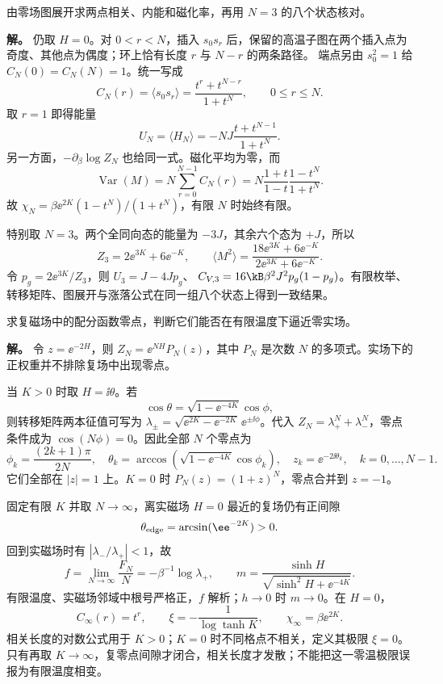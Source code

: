 \begin{exbox}[第四步：相关函数、能量与一个可逐态枚举的 $N=3$ 实例]
由零场图展开求两点相关、内能和磁化率，再用 $N=3$ 的八个状态核对。

\textbf{解。} 仍取 $H=0$。对 $0<r<N$，插入 $s_0s_r$ 后，保留的高温子图在两个插入点为奇度、其他点为偶度；环上恰有长度 $r$ 与 $N-r$ 的两条路径。
端点另由 $s_0^2=1$ 给 $C_N(0)=C_N(N)=1$。统一写成
\[
C_N(r)=\langle s_0s_r\rangle
=\frac{t^r+t^{N-r}}{1+t^N},\qquad 0\le r\le N.
\]
取 $r=1$ 即得能量
\[
U_N=\langle H_N\rangle=-NJ\frac{t+t^{N-1}}{1+t^N}.
\]
另一方面，$-\partial_\beta\log Z_N$ 也给同一式。磁化平均为零，而
\[
\operatorname{Var}(M)
=N\sum_{r=0}^{N-1}C_N(r)
=N\frac{1+t}{1-t}\frac{1-t^N}{1+t^N}.
\]
故 $\chi_N=\beta\ee^{2K}(1-t^N)/(1+t^N)$，有限 $N$ 时始终有限。

特别取 $N=3$。两个全同向态的能量为 $-3J$，其余六个态为 $+J$，所以
\[
Z_3=2\ee^{3K}+6\ee^{-K},\qquad
\langle M^2\rangle
=\frac{18\ee^{3K}+6\ee^{-K}}{2\ee^{3K}+6\ee^{-K}}.
\]
令 $p_g=2\ee^{3K}/Z_3$，则 $U_3=J-4Jp_g$、
$C_{V,3}=16\kB\beta^2J^2p_g(1-p_g)$。有限枚举、转移矩阵、图展开与涨落公式在同一组八个状态上得到一致结果。
\end{exbox}

\begin{exbox}
求复磁场中的配分函数零点，判断它们能否在有限温度下逼近零实场。

\textbf{解。} 令 $z=\ee^{-2H}$，则 $Z_N=\ee^{NH}P_N(z)$，其中 $P_N$ 是次数 $N$ 的多项式。实场下的正权重并不排除复场中出现零点。

当 $K>0$ 时取 $H=\ii\theta$。若
\[
\cos\theta=\sqrt{1-\ee^{-4K}}\cos\phi,
\]
则转移矩阵两本征值可写为
$\lambda_\pm=\sqrt{\ee^{2K}-\ee^{-2K}}\,\ee^{\pm\ii\phi}$。代入 $Z_N=\lambda_+^N+\lambda_-^N$，零点条件成为 $\cos(N\phi)=0$。因此全部 $N$ 个零点为
\[
\phi_k=\frac{(2k+1)\pi}{2N},\quad
\theta_k=\arccos\!\left(\sqrt{1-\ee^{-4K}}\cos\phi_k\right),\quad
z_k=\ee^{-2\ii\theta_k},\quad k=0,\ldots,N-1.
\]
它们全部在 $|z|=1$ 上。$K=0$ 时 $P_N(z)=(1+z)^N$，零点合并到 $z=-1$。

固定有限 $K$ 并取 $N\to\infty$，离实磁场 $H=0$ 最近的复场仍有正间隙
\[
\theta_{\rm edge}=\arcsin(\ee^{-2K})>0.
\]
回到实磁场时有 $|\lambda_-/\lambda_+|<1$，故
\[
f=\lim_{N\to\infty}\frac{F_N}{N}=-\beta^{-1}\log\lambda_+,
\qquad
m=\frac{\sinh H}{\sqrt{\sinh^2H+\ee^{-4K}}}.
\]
有限温度、实磁场邻域中根号严格正，$f$ 解析；$h\to0$ 时 $m\to0$。在 $H=0$，
\[
C_\infty(r)=t^r,\qquad
\xi=-\frac1{\log\tanh K},\qquad
\chi_\infty=\beta\ee^{2K}.
\]
相关长度的对数公式用于 $K>0$；$K=0$ 时不同格点不相关，定义其极限 $\xi=0$。
只有再取 $K\to\infty$，复零点间隙才闭合，相关长度才发散；不能把这一零温极限误报为有限温度相变。
\end{exbox}


